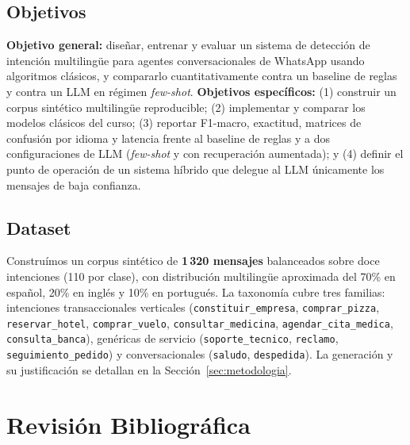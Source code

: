 \documentclass[journal]{IEEEtran}
\newcommand{\code}[1]{\texttt{\small #1}}
\begin{document}
\subsection{Objetivos}
\textbf{Objetivo general:} dise\~nar, entrenar y evaluar un sistema de
detecci\'on de intenci\'on multiling\"ue para agentes conversacionales de
WhatsApp usando algoritmos cl\'asicos, y compararlo cuantitativamente contra un
baseline de reglas y contra un LLM en r\'egimen \emph{few-shot}.
\textbf{Objetivos espec\'ificos:} (1) construir un corpus sint\'etico
multiling\"ue reproducible; (2) implementar y comparar los modelos cl\'asicos del
curso; (3) reportar F1-macro, exactitud, matrices de confusi\'on por idioma y
latencia frente al baseline de reglas y a dos configuraciones de LLM
(\emph{few-shot} y con recuperaci\'on aumentada); y (4) definir el punto de
operaci\'on de un sistema h\'ibrido que delegue al LLM \'unicamente los mensajes
de baja confianza.

\subsection{Dataset}
Constru\'imos un corpus sint\'etico de \textbf{1\,320 mensajes} balanceados sobre
doce intenciones (110 por clase), con distribuci\'on multiling\"ue aproximada del
70\% en espa\~nol, 20\% en ingl\'es y 10\% en portugu\'es. La taxonom\'ia cubre
tres familias: intenciones transaccionales verticales
(\code{constituir\_empresa}, \code{comprar\_pizza}, \code{reservar\_hotel},
\code{comprar\_vuelo}, \code{consultar\_medicina}, \code{agendar\_cita\_medica},
\code{consulta\_banca}), gen\'ericas de servicio (\code{soporte\_tecnico},
\code{reclamo}, \code{seguimiento\_pedido}) y conversacionales (\code{saludo},
\code{despedida}). La generaci\'on y su justificaci\'on se detallan en la
Secci\'on~\ref{sec:metodologia}.

\section{Revisi\'on Bibliogr\'afica}
\end{document}
